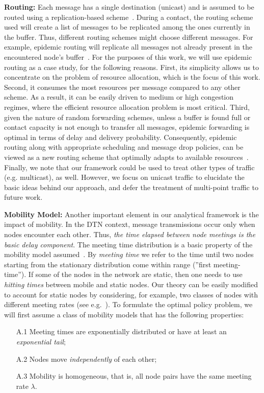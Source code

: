 \textbf{Routing:} Each message has a single destination (unicast) and is assumed to be routed using a replication-based scheme~\cite{akis:ton-multi}. During a contact, the routing scheme used will create a list of messages to be replicated among the ones currently in the buffer. Thus, different routing schemes might choose different messages. For example, epidemic routing will replicate all messages not already present in the encountered node's buffer~\cite{Vahdat:epidemic}. For the purposes of this work, we will use epidemic routing as a case study, for the following reasons. First, its simplicity allows us to concentrate on the problem of resource allocation, which is the focus of this work. Second, it consumes the most resources per message compared to any other scheme. As a result, it can be easily driven to medium or high congestion regimes, where the efficient resource allocation problem is most critical. Third, given the nature of random forwarding schemes, unless a buffer is found full or contact capacity is not enough to transfer all messages, epidemic forwarding is optimal in terms of delay and delivery probability. Consequently, epidemic routing along with appropriate scheduling and message drop policies, can be viewed as a new routing scheme that optimally adapts to available resources~\cite{Levine:Sigcomm07}.
Finally, we note that our framework could be used to treat other types of traffic (e.g. multicast), as well. However, we focus on unicast traffic to elucidate the basic ideas behind our approach, and defer the treatment of multi-point traffic to future work.

\textbf{Mobility Model:} Another important element in our analytical framework is the impact of mobility. In the DTN context, message transmissions occur only when nodes encounter each other. Thus, \emph{the time elapsed between node meetings is the basic delay component}. The meeting time distribution is a basic property of the mobility model assumed~\cite{akis:mobihoc06,Inria:MessageDelay}. By \emph{meeting time} we refer to the time until two nodes starting from the stationary distribution come within range (''first meeting-time''). If some of the nodes in the network are static, then one needs to use \emph{hitting times} between mobile and static nodes. Our theory can be easily modified to account for static nodes by considering, for example, two classes of nodes with different meeting rates (see e.g.~\cite{akis09}). To formulate the optimal policy problem, we will first assume a class of mobility models that has the following properties:
\begin{enumerate}
\item [A.1] Meeting times are exponentially distributed or have at least an \emph{exponential tail};
\item [A.2] Nodes move \emph{independently} of each other;
\item [A.3] Mobility is homogeneous, that is, all node pairs have the same meeting rate $\lambda$.
\end{enumerate}

